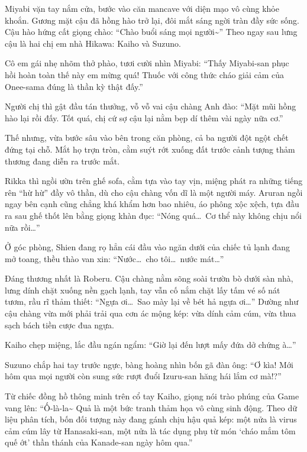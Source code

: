 \documentclass[../main.tex]{subfiles}
\begin{document}
Miyabi vặn tay nắm cửa, bước vào căn mancave với diện mạo vô cùng khỏe khoắn. Gương mặt cậu đã hồng hào trở lại, đôi mắt sáng ngời tràn đầy sức sống. Cậu hào hứng cất giọng chào: ``Chào buổi sáng mọi người\~{}'' Theo ngay sau lưng cậu là hai chị em nhà Hikawa: Kaiho và Suzuno.

Cô em gái nhẹ nhõm thở phào, tươi cười nhìn Miyabi: ``Thấy Miyabi-san phục hồi hoàn toàn thế này em mừng quá! Thuốc với công thức cháo giải cảm của Onee-sama đúng là thần kỳ thật đấy.''

Người chị thì gật đầu tán thưởng, vỗ vỗ vai cậu chàng Anh đào: ``Mặt mũi hồng hào lại rồi đấy. Tốt quá, chị cứ sợ cậu lại nằm bẹp dí thêm vài ngày nữa cơ.''

Thế nhưng, vừa bước sâu vào bên trong căn phòng, cả ba người đột ngột chết đứng tại chỗ. Mắt họ trợn tròn, cằm suýt rớt xuống đất trước cảnh tượng thảm thương đang diễn ra trước mắt.


Rikka thì ngồi ườn trên ghế sofa, cằm tựa vào tay vịn, miệng phát ra những tiếng rên ``hừ hừ'' đầy vô thần, dù cho cậu chàng vốn dĩ là một người máy. Aruran ngồi ngay bên cạnh cũng chẳng khá khẩm hơn bao nhiêu, áo phông xộc xệch, tựa đầu ra sau ghế thốt lên bằng giọng khàn đục: ``Nóng quá\dots\ Cơ thể này không chịu nổi nữa rồi\dots''

Ở góc phòng, Shien đang rọ hẳn cái đầu vào ngăn dưới của chiếc tủ lạnh đang mở toang, thều thào van xin: ``Nước\dots\ cho tôi\dots\ nước mát\dots''

Đáng thương nhất là Roberu. Cậu chàng nằm sõng soài trườn bò dưới sàn nhà, lưng dính chặt xuống nền gạch lạnh, tay vẫn cố nắm chặt lấy tấm vé số nát tươm, rầu rĩ thảm thiết: ``Ngựa ơi\dots\ Sao mày lại về bét hả ngựa ơi\dots'' Dường như cậu chàng vừa mới phải trải qua cơn ác mộng kép: vừa dính cảm cúm, vừa thua sạch bách tiền cược đua ngựa.

Kaiho chẹp miệng, lắc đầu ngán ngẩm: ``Giờ lại đến lượt mấy đứa dở chứng à\dots''

Suzuno chắp hai tay trước ngực, bàng hoàng nhìn bốn gã đàn ông: ``Ơ kìa! Mới hôm qua mọi người còn sung sức rượt đuổi Izuru-san hăng hái lắm cơ mà!?''

Từ chiếc đồng hồ thông minh trên cổ tay Kaiho, giọng nói trào phúng của Game vang lên: ``Ố-là-la\~{} Quả là một bức tranh thảm họa vô cùng sinh động. Theo dữ liệu phân tích, bốn đối tượng này đang gánh chịu hậu quả kép: một nửa là virus cảm cúm lây từ Hanasaki-san, một nửa là tác dụng phụ từ món `cháo mắm tôm quế ớt' thần thánh của Kanade-san ngày hôm qua.''
\end{document}
